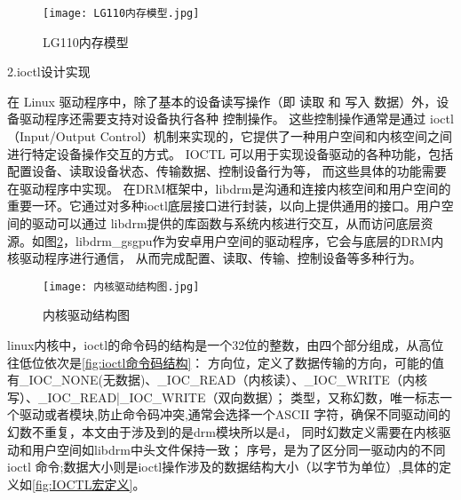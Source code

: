 \begin{figure}[h]
  \centering
  \texttt{[image: LG110内存模型.jpg]}
  \caption{LG110内存模型}
  \label{fig:LG110内存模型}
\end{figure}


2.ioctl设计实现

在 Linux 驱动程序中，除了基本的设备读写操作（即 读取 和 写入 数据）外，设备驱动程序还需要支持对设备执行各种 控制操作。
这些控制操作通常是通过 ioctl（Input/Output Control）机制来实现的，它提供了一种用户空间和内核空间之间进行特定设备操作交互的方式。
IOCTL 可以用于实现设备驱动的各种功能，包括配置设备、读取设备状态、传输数据、控制设备行为等， 而这些具体的功能需要在驱动程序中实现。
在DRM框架中，libdrm是沟通和连接内核空间和用户空间的重要一环。它通过对多种ioctl底层接口进行封装，以向上提供通用的接口。用户空间的驱动可以通过
libdrm提供的库函数与系统内核进行交互，从而访问底层资源。如图\ref{fig:内核驱动结构图}，libdrm\_gsgpu作为安卓用户空间的驱动程序，它会与底层的DRM内核驱动程序进行通信，
从而完成配置、读取、传输、控制设备等多种行为。

\begin{figure}[h]
  \centering
  \texttt{[image: 内核驱动结构图.jpg]}
  \caption{内核驱动结构图}
  \label{fig:内核驱动结构图}
\end{figure}

linux内核中，ioctl的命令码的结构是一个32位的整数，由四个部分组成，从高位往低位依次是\ref{fig:ioctl命令码结构}：
方向位，定义了数据传输的方向，可能的值有\_IOC\_NONE(无数据)、\_IOC\_READ（内核读）、\_IOC\_WRITE（内核写）、\_IOC\_READ|\_IOC\_WRITE（双向数据）；
类型，又称幻数，唯一标志一个驱动或者模块,防止命令码冲突,通常会选择一个ASCII 字符，确保不同驱动间的幻数不重复，本文由于涉及到的是drm模块所以是d，
同时幻数定义需要在内核驱动和用户空间如libdrm中头文件保持一致；
序号，是为了区分同一驱动内的不同 ioctl 命令;数据大小则是ioctl操作涉及的数据结构大小（以字节为单位）,具体的定义如\ref{fig:IOCTL宏定义}。

